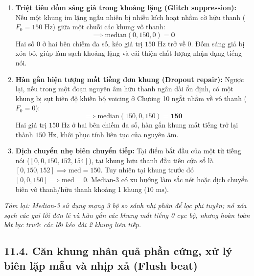 \begin{enumerate}
    \item \textbf{Triệt tiêu đốm sáng giả trong khoảng lặng (Glitch suppression):}
    Nếu một khung im lặng ngẫu nhiên bị nhiễu kích hoạt nhầm cờ hữu thanh ($F_0 = 150\text{ Hz}$) giữa một chuỗi các khung vô thanh:
    \begin{equation}
        [0, 0, \mathbf{150}, 0, 0] \implies \text{median}(0, 150, 0) = \mathbf{0}
    \end{equation}
    Hai số 0 ở hai bên chiếm đa số, kéo giá trị $150\text{ Hz}$ trở về $0$. Đốm sáng giả bị xóa bỏ, giúp làm sạch khoảng lặng và cải thiện chất lượng nhận dạng tiếng nói.
    \item \textbf{Hàn gắn hiện tượng mất tiếng đơn khung (Dropout repair):}
    Ngược lại, nếu trong một đoạn nguyên âm hữu thanh ngân dài ổn định, có một khung bị sụt biên độ khiến bộ voicing ở Chương 10 ngắt nhầm về vô thanh ($F_0 = 0$):
    \begin{equation}
        [150, 150, \mathbf{0}, 150, 150] \implies \text{median}(150, 0, 150) = \mathbf{150}
    \end{equation}
    Hai giá trị $150\text{ Hz}$ ở hai bên chiếm đa số, hàn gắn khung mất tiếng trở lại thành $150\text{ Hz}$, khôi phục tính liên tục của nguyên âm.
    \item \textbf{Dịch chuyển nhẹ biên chuyển tiếp:}
    Tại điểm bắt đầu của một từ tiếng nói ($[0, 0, 150, 152, 154]$), tại khung hữu thanh đầu tiên cửa sổ là $[0, 150, 152] \implies \text{med} = 150$. Tuy nhiên tại khung trước đó $[0, 0, 150] \implies \text{med} = 0$. Median-3 có xu hướng làm sắc nét hoặc dịch chuyển biên vô thanh/hữu thanh khoảng 1 khung ($10\text{ ms}$).
\end{enumerate}

\textit{Tóm lại: Median-3 sử dụng mạng 3 bộ so sánh nhị phân để lọc phi tuyến; nó xóa sạch các gai lỗi đơn lẻ và hàn gắn các khung mất tiếng 0 cục bộ, nhưng hoàn toàn bất lực trước các lỗi kéo dài 2 khung liên tiếp.}

\subsection*{11.4. Căn khung nhân quả phần cứng, xử lý biên lặp mẫu và nhịp xả (Flush beat)}

